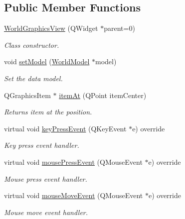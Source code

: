 \subsection*{Public Member Functions}
\begin{DoxyCompactItemize}
\item 
\hyperlink{classWorldGraphicsView_aac181c5fb59c553a885afc62c9f58576}{World\+Graphics\+View} (Q\+Widget $\ast$parent=0)
\begin{DoxyCompactList}\small\item\em Class constructor. \end{DoxyCompactList}\item 
void \hyperlink{classWorldGraphicsView_ac9bfe6153b0106f0cb6591b511f9391a}{set\+Model} (\hyperlink{classWorldModel}{World\+Model} $\ast$model)
\begin{DoxyCompactList}\small\item\em Set the data model. \end{DoxyCompactList}\item 
Q\+Graphics\+Item $\ast$ \hyperlink{classWorldGraphicsView_afb08a8e079c13070a66804da4476cb60}{item\+At} (Q\+Point item\+Center)
\begin{DoxyCompactList}\small\item\em Returns item at the position. \end{DoxyCompactList}\item 
virtual void \hyperlink{classWorldGraphicsView_abdb212ddc141fdc73054bab7b5320d51}{key\+Press\+Event} (Q\+Key\+Event $\ast$e) override
\begin{DoxyCompactList}\small\item\em Key press event handler. \end{DoxyCompactList}\item 
virtual void \hyperlink{classWorldGraphicsView_af4b8a71cfd9f363c8056a506ef60344c}{mouse\+Press\+Event} (Q\+Mouse\+Event $\ast$e) override
\begin{DoxyCompactList}\small\item\em Mouse press event handler. \end{DoxyCompactList}\item 
virtual void \hyperlink{classWorldGraphicsView_a07a8843b73603a3eb71f768308aa5310}{mouse\+Move\+Event} (Q\+Mouse\+Event $\ast$e) override
\begin{DoxyCompactList}\small\item\em Mouse move event handler. \end{DoxyCompactList}\end{DoxyCompactItemize}


